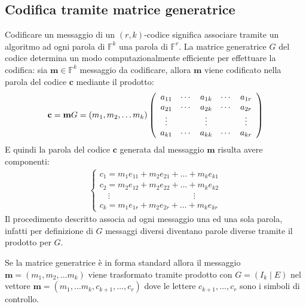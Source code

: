 \subsection{Codifica tramite matrice generatrice}

Codificare un messaggio di un $(r,k)$-codice significa associare tramite un algoritmo ad ogni parola di $\mathbb{F}^{k}$ una parola di $\mathbb{F}^{r}$. La matrice generatrice $G$ del codice determina un modo computazionalmente efficiente per effettuare la codifica: sia $\mathbf{m} \in \mathbb{F}^{k}$ messaggio da codificare, allora $\mathbf{m}$ viene codificato nella parola del codice $\mathbf{c}$ mediante il prodotto:
\begin{align*}
  \mathbf{c} = \mathbf{m}G = (m_1 ,m_2 , \dots m_{k})
  \left(
  \begin{array} {c c c c c}
  a_{11} & \cdots & a_{1k} & \cdots & a_{1r} \\
  a_{21} & \cdots & a_{2k} & \cdots & a_{2r} \\
  \vdots &  & \vdots & & \vdots \\
  a_{k1} & \cdots & a_{kk} & \cdots & a_{kr}
  \end{array}
  \right)
\end{align*}
E quindi la parola del codice $\mathbf{c}$ generata dal messaggio $\mathbf{m}$ risulta avere componenti:
\begin{align*}
  \left\{
  \begin{array} {l}
  c_{1} = m_{1}e_{11} + m_{2}e_{21} + \dots + m_{k}e_{k1} \\
  c_{2} = m_{2}e_{12} + m_{2}e_{22} + \dots + m_{k}e_{k2} \\
  \quad \vdots \qquad \qquad \qquad \qquad \qquad \vdots\\
  c_{k} = m_{1}e_{1r} + m_{2}e_{2r} + \dots + m_{k}e_{kr}
  \end{array}
  \right.
\end{align*}
Il procedimento descritto associa ad ogni messaggio una ed una sola parola, infatti per definizione di $G$ messaggi diversi diventano parole diverse tramite il prodotto per $G$.

Se la matrice generatrice è in forma standard allora il messaggio $\mathbf{m} = (m_1 ,m_2 , \dots m_{k}) $ viene trasformato tramite prodotto con $ G = (I_{k} \mid E)$ nel vettore $\mathbf{m} = (m_1 ,\dots m_{k}, c_{k+1}, \dots , c_{r})$ dove le lettere $c_{k+1}, \dots , c_{r}$ sono i simboli di controllo.


